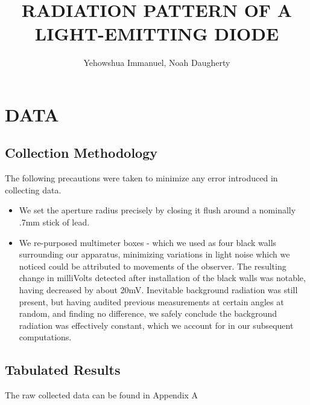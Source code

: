 \documentclass[10pt,a4paper]{article}
\title{RADIATION PATTERN OF A LIGHT-EMITTING DIODE}
\author{Yehowshua Immanuel, Noah Daugherty}
\begin{document}
\maketitle
\tableofcontents
\newpage



\section{DATA}
\subsection{Collection Methodology}
The following precautions were taken to minimize any error introduced in collecting data.

\begin{itemize}
    \item We set the aperture radius precisely by closing it flush around a nominally .7mm stick of lead.
    \item We re-purposed multimeter boxes - which we used as four black walls surrounding our apparatus, minimizing variations in light noise which we noticed could be attributed to movements of the observer. The resulting change in milliVolts detected after installation of the black walls was notable, having decreased by about 20mV. Inevitable background radiation was still present, but having audited previous measurements at certain angles at random, and finding no difference, we safely conclude the background radiation was effectively constant, which we account for in our subsequent computations.
\end{itemize}

\subsection{Tabulated Results}
The raw collected data can be found in Appendix A

\newpage

\end{document}
